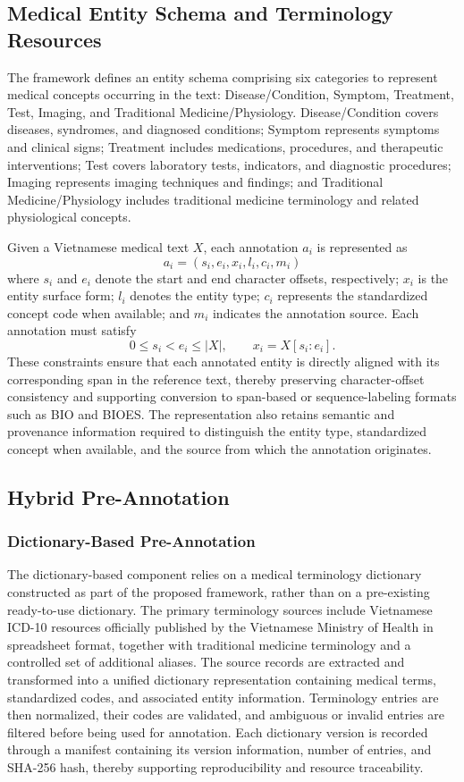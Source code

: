\documentclass[runningheads]{llncs}
\begin{document}
\subsection{Medical Entity Schema and Terminology Resources}
The framework defines an entity schema comprising six categories to represent medical concepts occurring in the text: Disease/Condition, Symptom, Treatment, Test, Imaging, and Traditional Medicine/Physiology. Disease/Condition covers diseases, syndromes, and diagnosed conditions; Symptom represents symptoms and clinical signs; Treatment includes medications, procedures, and therapeutic interventions; Test covers laboratory tests, indicators, and diagnostic procedures; Imaging represents imaging techniques and findings; and Traditional Medicine/Physiology includes traditional medicine terminology and related physiological concepts.

Given a Vietnamese medical text $X$, each annotation $a_i$ is represented as
\[
a_i = (s_i, e_i, x_i, l_i, c_i, m_i)
\]
where $s_i$ and $e_i$ denote the start and end character offsets, respectively; $x_i$ is the entity surface form; $l_i$ denotes the entity type; $c_i$ represents the standardized concept code when available; and $m_i$ indicates the annotation source. Each annotation must satisfy
\[
0 \leq s_i < e_i \leq |X|,\qquad x_i = X[s_i:e_i].
\]
These constraints ensure that each annotated entity is directly aligned with its corresponding span in the reference text, thereby preserving character-offset consistency and supporting conversion to span-based or sequence-labeling formats such as BIO and BIOES. The representation also retains semantic and provenance information required to distinguish the entity type, standardized concept when available, and the source from which the annotation originates.

\subsection{Hybrid Pre-Annotation}
\subsubsection{Dictionary-Based Pre-Annotation}
The dictionary-based component relies on a medical terminology dictionary constructed as part of the proposed framework, rather than on a pre-existing ready-to-use dictionary. The primary terminology sources include Vietnamese ICD-10 resources officially published by the Vietnamese Ministry of Health in spreadsheet format, together with traditional medicine terminology and a controlled set of additional aliases. The source records are extracted and transformed into a unified dictionary representation containing medical terms, standardized codes, and associated entity information. Terminology entries are then normalized, their codes are validated, and ambiguous or invalid entries are filtered before being used for annotation. Each dictionary version is recorded through a manifest containing its version information, number of entries, and SHA-256 hash, thereby supporting reproducibility and resource traceability.
\end{document}
